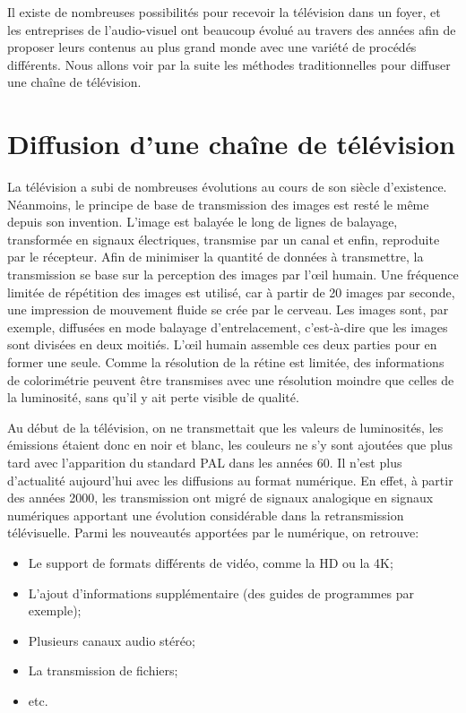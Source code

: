 \documentclass{polytech/polytech}
\begin{document}
Il existe de nombreuses possibilités pour recevoir la télévision dans un foyer, et les entreprises de l'audio-visuel ont beaucoup évolué au travers des années afin de proposer leurs contenus au plus grand monde avec une variété de procédés différents. Nous allons voir par la suite les méthodes traditionnelles pour diffuser une chaîne de télévision.


\section{Diffusion d'une chaîne de télévision}

La télévision a subi de nombreuses évolutions au cours de son siècle d'existence. Néanmoins, le principe de base de transmission des images est resté le même depuis son invention. L'image est balayée le long de lignes de balayage, transformée en signaux électriques, transmise par un canal et enfin, reproduite par le récepteur. Afin de minimiser la quantité de données à transmettre, la transmission se base sur la perception des images par l'\oe{}il humain. Une fréquence limitée de répétition des images est utilisé, car à partir de 20 images par seconde, une impression de mouvement fluide se crée par le cerveau. Les images sont, par exemple, diffusées en mode balayage d'entrelacement, c'est-à-dire que les images sont divisées en deux moitiés. L'\oe{}il humain assemble ces deux parties pour en former une seule. Comme la résolution de la rétine est limitée, des informations de colorimétrie peuvent être transmises avec une résolution moindre que celles de la luminosité, sans qu'il y ait perte visible de qualité. 

Au début de la télévision, on ne transmettait que les valeurs de luminosités, les émissions étaient donc en noir et blanc, les couleurs ne s'y sont ajoutées que plus tard avec l'apparition du standard PAL dans les années 60. Il n'est plus d'actualité aujourd'hui avec les diffusions au format numérique. En effet, à partir des années 2000, les transmission ont migré de signaux analogique en signaux numériques apportant une évolution considérable dans la retransmission télévisuelle. Parmi les nouveautés apportées par le numérique, on retrouve:

\begin{itemize}
	\item Le support de formats différents de vidéo, comme la HD ou la 4K;
	\item L'ajout d'informations supplémentaire (des guides de programmes par exemple);
	\item Plusieurs canaux audio stéréo;
	\item La transmission de fichiers;
	\item etc.
\end{itemize}
\end{document}
